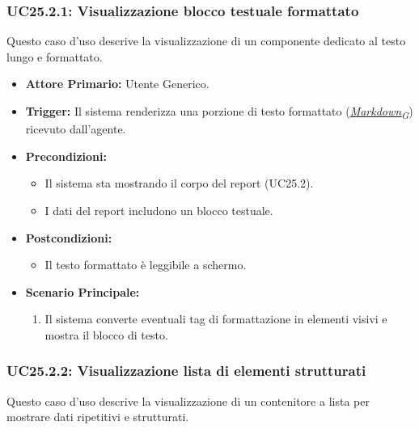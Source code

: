 \documentclass[12pt, a4paper]{article}
\newcommand{\urlglossario}{https://skynetunigroup.github.io/Code_Guardian/Documentazione/PB/glossario_v2.0.0.pdf} %
\newcommand{\glo}[2]{\href{\urlglossario\#nameddest=#2}{#1\textsubscript{G}}}
\begin{document}
\subsubsection{UC25.2.1: Visualizzazione blocco testuale formattato}\label{uc:25.2.1}
Questo caso d'uso descrive la visualizzazione di un componente dedicato al testo lungo e formattato.

\begin{itemize}
    \item \textbf{Attore Primario:} Utente Generico.
    \item \textbf{Trigger:} Il sistema renderizza una porzione di testo formattato (\textit{\glo{Markdown}{markdown}}) ricevuto dall'agente.\newpage
    \item \textbf{Precondizioni:}
    \begin{itemize}
        \item Il sistema sta mostrando il corpo del report (UC25.2).
        \item I dati del report includono un blocco testuale.
    \end{itemize}
    \item \textbf{Postcondizioni:}
    \begin{itemize}
        \item Il testo formattato è leggibile a schermo.
    \end{itemize}
    \item \textbf{Scenario Principale:}
    \begin{enumerate}
        \item Il sistema converte eventuali tag di formattazione in elementi visivi e mostra il blocco di testo.
    \end{enumerate}
\end{itemize}

\subsubsection{UC25.2.2: Visualizzazione lista di elementi strutturati}\label{uc:25.2.2}
Questo caso d'uso descrive la visualizzazione di un contenitore a lista per mostrare dati ripetitivi e strutturati.
\end{document}
